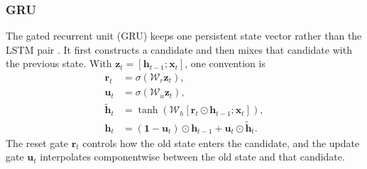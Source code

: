 \documentclass[11pt]{article}
\begin{document}
\subsubsection{GRU}
The gated recurrent unit (GRU) keeps one persistent state vector rather than
the LSTM pair \citep{cho2014gru}.  It first constructs a candidate and then
mixes that candidate with the previous state.  With
$\bm{z}_t=[\bm{h}_{t-1};\bm{x}_t]$, one convention is
\begin{equation}
  \begin{split}
  \bm{r}_t
  &=\sigma(\mathcal W_r\bm{z}_t),\\
  \bm{u}_t
  &=\sigma(\mathcal W_u\bm{z}_t),\\
  \widetilde{\bm{h}}_t
  &=\tanh\!\left(
    \mathcal W_h[
      \bm{r}_t\odot\bm{h}_{t-1};\bm{x}_t
    ]\right),\\
  \bm{h}_t
  &=(\bm{1}-\bm{u}_t)\odot\bm{h}_{t-1}
    +\bm{u}_t\odot\widetilde{\bm{h}}_t.
  \label{eq:gru-cell}
  \end{split}
\end{equation}
The reset gate $\bm r_t$ controls how the old state enters the candidate, and
the update gate $\bm u_t$ interpolates componentwise between the old state and
that candidate.
\end{document}
